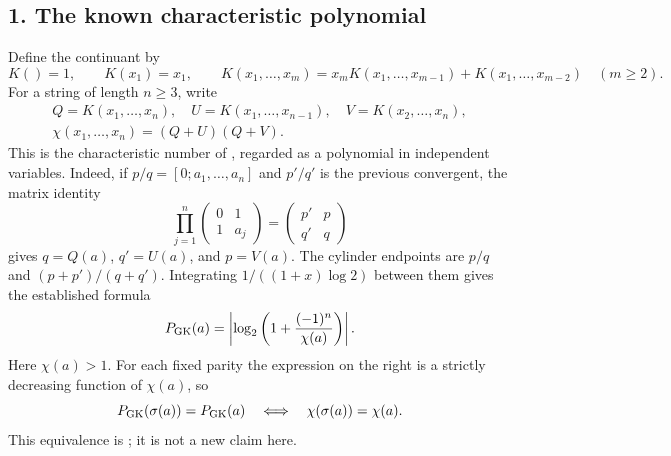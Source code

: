 \documentclass[11pt]{article}
\begin{document}
\subsection*{1. The known characteristic polynomial}
Define the continuant by
\[
 K()=1,\qquad K(x_1)=x_1,\qquad
 K(x_1,\ldots,x_m)=x_mK(x_1,\ldots,x_{m-1})
                         +K(x_1,\ldots,x_{m-2})\quad(m\ge2).
\]
For a string of length $n\ge3$, write
\[
 \begin{gathered}
 Q=K(x_1,\ldots,x_n),\quad
 U=K(x_1,\ldots,x_{n-1}),\quad V=K(x_2,\ldots,x_n),\\
 \chi(x_1,\ldots,x_n)=(Q+U)(Q+V).
 \end{gathered}
\]
This is the characteristic number of \cite[Definition 5.1]{SZH},
regarded as a polynomial in independent variables.
Indeed, if $p/q=[0;a_1,\ldots,a_n]$ and $p'/q'$ is the previous
convergent, the matrix identity
\[
 \prod_{j=1}^n
 \begin{pmatrix}0&1\\1&a_j\end{pmatrix}
 =
 \begin{pmatrix}p'&p\\q'&q\end{pmatrix}
\]
gives $q=Q(a)$, $q'=U(a)$, and $p=V(a)$.
The cylinder endpoints are $p/q$ and $(p+p')/(q+q')$.
Integrating $1/((1+x)\log2)$ between them gives the established formula
\cite[Lemma 2.5]{SZH}
\begin{equation}\label{eq:measure}
 P_{\rm GK}(a)=
 \left|\log_2\left(1+\frac{(-1)^n}{\chi(a)}\right)\right|.
\end{equation}
Here $\chi(a)>1$. For each fixed parity the expression on the right
is a strictly decreasing function of $\chi(a)$, so
\begin{equation}\label{eq:equivalence}
 P_{\rm GK}(\sigma(a))=P_{\rm GK}(a)
 \quad\Longleftrightarrow\quad
 \chi(\sigma(a))=\chi(a).
\end{equation}
This equivalence is \cite[Lemma 5.2]{SZH}; it is not a new claim here.
\end{document}
